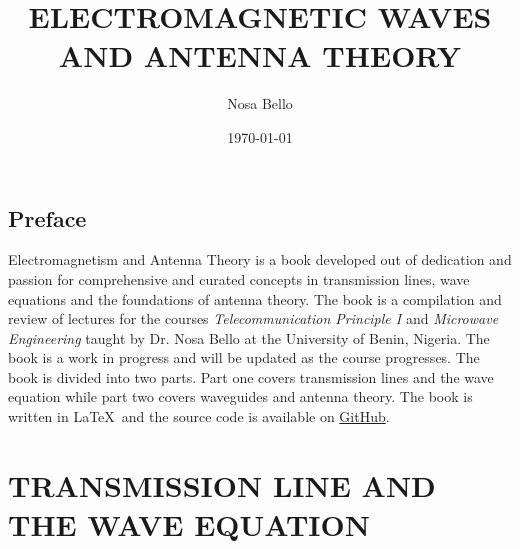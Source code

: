 \documentclass[a4paper,10pt, twocolumn]{book}
\begin{document}
\author{Nosa Bello}
\title{\color{blue}ELECTROMAGNETIC WAVES AND ANTENNA THEORY}
\date{\today}

\frontmatter
\maketitle
\tableofcontents

\chapter{Preface}
Electromagnetism and Antenna Theory is a book developed out of dedication and passion for comprehensive and curated concepts in transmission lines, wave equations and the foundations of antenna theory. The book is a compilation and review of lectures for the courses \textit{Telecommunication Principle I} and \textit{Microwave Engineering} taught by Dr. Nosa Bello at the University of Benin, Nigeria. The book is a work in progress and will be updated as the course progresses. The book is divided into two parts. Part one covers transmission lines and the wave equation while part two covers waveguides and antenna theory. The book is written in \LaTeX\ and the source code is available on \href{https://github.com/allisonoge/electromagnetism-and-antenna-theory-v2.git}{GitHub}.

\mainmatter

\part{TRANSMISSION LINE AND THE WAVE EQUATION}





% 
% 
% 
% 
% 
% 
% 
% 
% 
% 
% 


% 
% 
% 
% 
% 
% 
% 
% 
% 
% 
%  
% 
% 
% 
% 
% 
% 
% 
\end{document}
